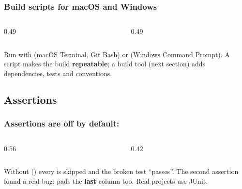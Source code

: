 \documentclass[aspectratio=169,10pt,compress]{beamer}
\begin{document}
\begin{frame}[t,fragile] \frametitle{Build scripts for macOS and Windows}
  \begin{columns}[T]
    \begin{column}{0.49\textwidth}
    \end{column}
    \begin{column}{0.49\textwidth}
    \end{column}
  \end{columns}
  \small Run with  (macOS Terminal, Git Bash) or  (Windows Command Prompt).
  A script makes the build \textbf{repeatable}; a build tool (next section) adds dependencies, tests and conventions.
\end{frame}


\subsection[Assertions]{Assertions}




\begin{frame}[t,fragile] \frametitle{Assertions are off by default: }
  \begin{columns}[T]
    \begin{column}{0.56\textwidth}
    \end{column}
    \begin{column}{0.42\textwidth}
    \end{column}
  \end{columns}

  \vspace{0.1em}
  \small Without  () every  is skipped and the broken test ``passes''.
  The second assertion found a real bug:  pads the \textbf{last} column too. Real projects use JUnit.
\end{frame}
\end{document}
